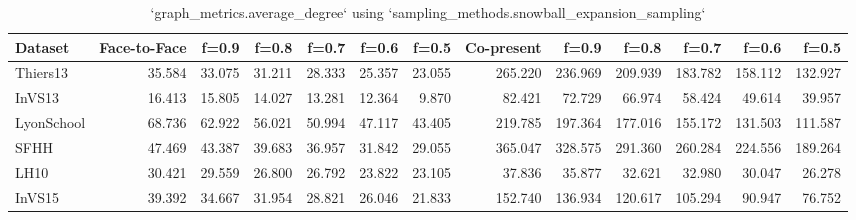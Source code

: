\begin{table}[ht]
\begin{tabular}{lrrrrrrrrrrrr}
\hline
 Dataset    &   Face-to-Face &   f=0.9 &   f=0.8 &   f=0.7 &   f=0.6 &   f=0.5 &   Co-present &   f=0.9 &   f=0.8 &   f=0.7 &   f=0.6 &   f=0.5 \\
\hline
 Thiers13   &         35.584 &  33.075 &  31.211 &  28.333 &  25.357 &  23.055 &      265.220 & 236.969 & 209.939 & 183.782 & 158.112 & 132.927 \\
 InVS13     &         16.413 &  15.805 &  14.027 &  13.281 &  12.364 &   9.870 &       82.421 &  72.729 &  66.974 &  58.424 &  49.614 &  39.957 \\
 LyonSchool &         68.736 &  62.922 &  56.021 &  50.994 &  47.117 &  43.405 &      219.785 & 197.364 & 177.016 & 155.172 & 131.503 & 111.587 \\
 SFHH       &         47.469 &  43.387 &  39.683 &  36.957 &  31.842 &  29.055 &      365.047 & 328.575 & 291.360 & 260.284 & 224.556 & 189.264 \\
 LH10       &         30.421 &  29.559 &  26.800 &  26.792 &  23.822 &  23.105 &       37.836 &  35.877 &  32.621 &  32.980 &  30.047 &  26.278 \\
 InVS15     &         39.392 &  34.667 &  31.954 &  28.821 &  26.046 &  21.833 &      152.740 & 136.934 & 120.617 & 105.294 &  90.947 &  76.752 \\
\hline
\end{tabular}
\caption{`graph_metrics.average_degree` using `sampling_methods.snowball_expansion_sampling`}
\end{table}